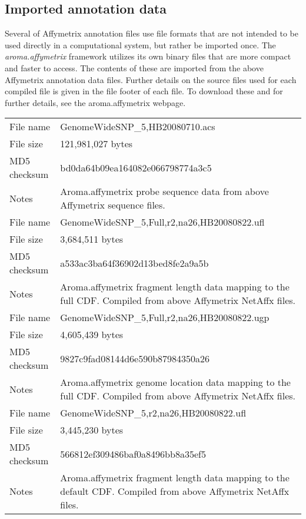 \documentclass[10pt,a4paper]{article}
\newcommand{\pkg}[1]{\textit{#1}\xspace}
\begin{document}
\clearpage
\subsection{Imported annotation data}
Several of Affymetrix annotation files use file formats that are not intended to be used directly in a computational system, but rather be imported once.  The \pkg{aroma.affymetrix} framework utilizes its own binary files that are more compact and faster to access.  The contents of these are imported from the above Affymetrix annotation data files.  Further details on the source files used for each compiled file is given in the file footer of each file.  To download these and for further details, see the aroma.affymetrix webpage.

\begin{table}[hp]
\begin{center}
\begin{tabular}{lp{}}
\hline
File name    & GenomeWideSNP\_5,HB20080710.acs \\
File size    & 121,981,027 bytes \\
MD5 checksum & bd0da64b09ea164082e066798774a3c5 \\
Notes        & Aroma.affymetrix probe sequence data from above Affymetrix sequence files. \\
\hline
File name    & GenomeWideSNP\_5,Full,r2,na26,HB20080822.ufl \\
File size    & 3,684,511 bytes \\
MD5 checksum & a533ac3ba64f36902d13bed8fe2a9a5b \\
Notes        & Aroma.affymetrix fragment length data mapping to the full CDF.  Compiled from above Affymetrix NetAffx files. \\
\hline
File name    & GenomeWideSNP\_5,Full,r2,na26,HB20080822.ugp \\
File size    & 4,605,439 bytes \\
MD5 checksum & 9827c9fad08144d6e590b87984350a26 \\
Notes        & Aroma.affymetrix genome location data mapping to the full CDF.  Compiled from above Affymetrix NetAffx files. \\
\hline
File name    & GenomeWideSNP\_5,r2,na26,HB20080822.ufl \\
File size    & 3,445,230 bytes \\
MD5 checksum & 566812ef309486baf0a8496bb8a35ef5 \\
Notes        & Aroma.affymetrix fragment length data mapping to the default CDF.  Compiled from above Affymetrix NetAffx files. \\

\end{tabular}
\end{center}
\end{table}
\end{document}
